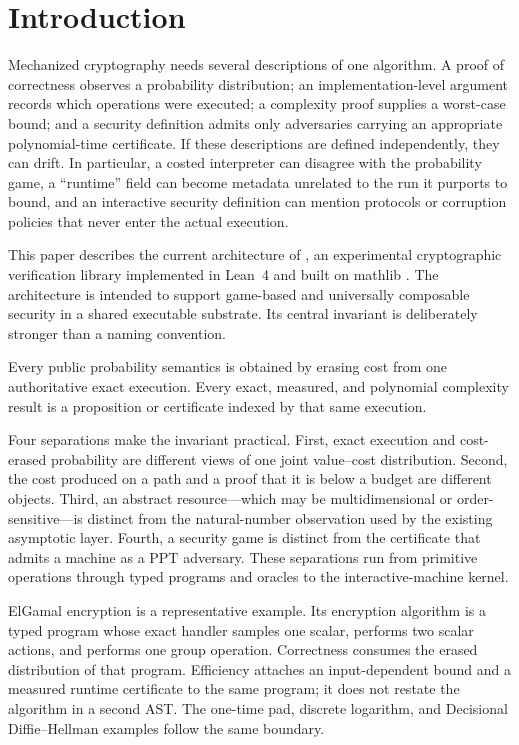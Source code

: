 \section{Introduction}
\label{sec:introduction}

Mechanized cryptography needs several descriptions of one algorithm.  A proof
of correctness observes a probability distribution; an implementation-level
argument records which operations were executed; a complexity proof supplies a
worst-case bound; and a security definition admits only adversaries carrying an
appropriate polynomial-time certificate.  If these descriptions are defined
independently, they can drift.  In particular, a costed interpreter can disagree
with the probability game, a ``runtime'' field can become metadata unrelated to
the run it purports to bound, and an interactive security definition can mention
protocols or corruption policies that never enter the actual execution.

This paper describes the current architecture of \LeanCrypto, an experimental
cryptographic verification library implemented in Lean~4
\cite{deMouraUllrich2021Lean4} and built on mathlib
\cite{mathlib2020}.  The architecture is intended to support game-based and
universally composable security in a shared executable substrate.  Its central
invariant is deliberately stronger than a naming convention.

\begin{designprinciple}
Every public probability semantics is obtained by erasing cost from one
authoritative exact execution.  Every exact, measured, and polynomial
complexity result is a proposition or certificate indexed by that same
execution.
\end{designprinciple}

Four separations make the invariant practical.  First, exact execution and
cost-erased probability are different views of one joint value--cost
distribution.  Second, the cost produced on a path and a proof that it is below
a budget are different objects.  Third, an abstract resource---which may be
multidimensional or order-sensitive---is distinct from the natural-number
observation used by the existing asymptotic layer.  Fourth, a security game is
distinct from the certificate that admits a machine as a PPT adversary.  These
separations run from primitive operations through typed programs and oracles to
the interactive-machine kernel.

ElGamal encryption is a representative example.  Its encryption algorithm is
a typed program whose exact handler samples one scalar, performs two scalar
actions, and performs one group operation.  Correctness consumes the erased
distribution of that program.  Efficiency attaches an input-dependent bound
and a measured runtime certificate to the same program; it does not restate the
algorithm in a second AST.  The one-time pad, discrete logarithm, and
Decisional Diffie--Hellman examples follow the same boundary.

